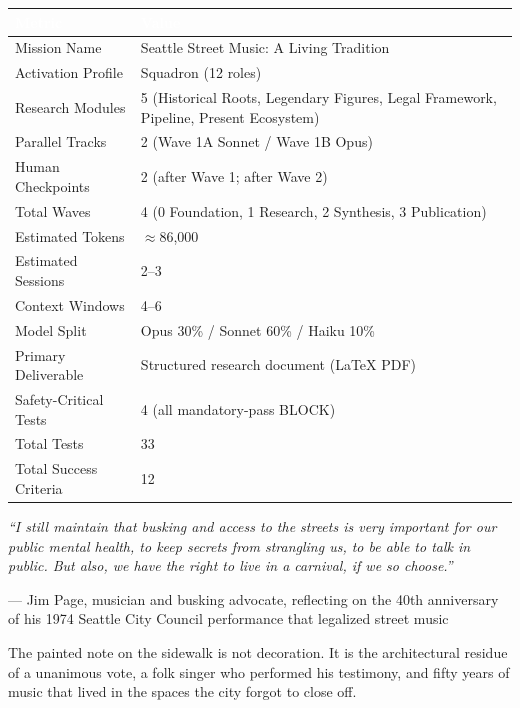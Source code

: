 \documentclass[11pt,letterpaper]{article}
\newcommand{\tableheader}[1]{\textbf{\sffamily\textcolor{white}{#1}}}
\begin{document}
\begin{center}
\begin{tabularx}{\textwidth}{L{4cm}X}
\toprule
{}
\tableheader{Metric} & \tableheader{Value} \\
\midrule
Mission Name & Seattle Street Music: A Living Tradition \\
Activation Profile & Squadron (12 roles) \\
Research Modules & 5 (Historical Roots, Legendary Figures, Legal Framework, Pipeline, Present Ecosystem) \\
Parallel Tracks & 2 (Wave 1A Sonnet / Wave 1B Opus) \\
Human Checkpoints & 2 (after Wave 1; after Wave 2) \\
Total Waves & 4 (0 Foundation, 1 Research, 2 Synthesis, 3 Publication) \\
Estimated Tokens & $\approx$86,000 \\
Estimated Sessions & 2--3 \\
Context Windows & 4--6 \\
Model Split & Opus 30\% / Sonnet 60\% / Haiku 10\% \\
Primary Deliverable & Structured research document (LaTeX PDF) \\
Safety-Critical Tests & 4 (all mandatory-pass BLOCK) \\
Total Tests & 33 \\
Total Success Criteria & 12 \\
\bottomrule
\end{tabularx}
\end{center}

\vspace{2em}
\begin{quotebox}
\textit{``I still maintain that busking and access to the streets is very important for our public mental health, to keep secrets from strangling us, to be able to talk in public. But also, we have the right to live in a carnival, if we so choose.''}

\vspace{0.5em}
\hfill --- Jim Page, musician and busking advocate, reflecting on the 40th anniversary\\
\hfill of his 1974 Seattle City Council performance that legalized street music

\vspace{1em}
\textcolor{tertiary}{\small\sffamily The painted note on the sidewalk is not decoration. It is the architectural residue of a unanimous vote, a folk singer who performed his testimony, and fifty years of music that lived in the spaces the city forgot to close off.}
\end{quotebox}
\end{document}
